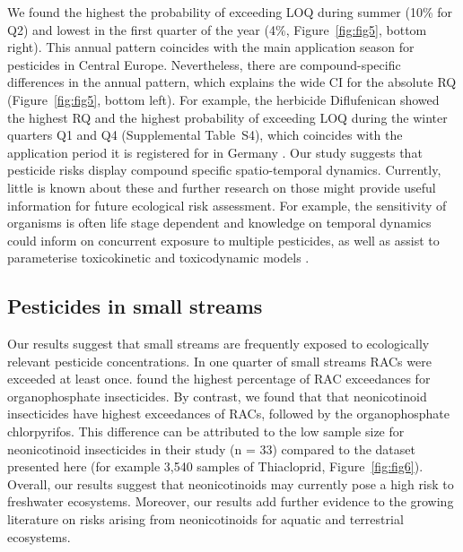 \documentclass[journal=esthag,manuscript=article]{achemso}
\begin{document}
We found the highest the probability of exceeding LOQ during summer (10\% for Q2) and lowest in the first quarter of the year (4\%, Figure~\ref{fig:fig5}, bottom right).
This annual pattern coincides with the main application season for pesticides in Central Europe.
Nevertheless, there are compound-specific differences in the annual pattern, which explains the wide CI for the absolute RQ (Figure~\ref{fig:fig5}, bottom left). 
For example, the herbicide Diflufenican showed the highest RQ and the highest probability of exceeding LOQ during the winter quarters Q1 and Q4 (Supplemental Table~S4), which coincides with the application period it is registered for in Germany \citep{bvl_online_2016}.
Our study suggests that pesticide risks display compound specific spatio-temporal dynamics.
Currently, little is known about these and further research on those might provide useful information for future ecological risk assessment. 
For example, the sensitivity of organisms is often life stage dependent \citep{hutchinson1998analysis} and knowledge on temporal dynamics could inform on concurrent exposure to multiple pesticides, as well as assist to parameterise toxicokinetic and toxicodynamic models \citep{ashauer2016modelling}. 


\subsection{Pesticides in small streams}
Our results suggest that small streams are frequently exposed to ecologically relevant pesticide concentrations.
In one quarter of small streams RACs were exceeded at least once.
\citet{stehle_pesticide_2015} found the highest percentage of RAC exceedances for organophosphate insecticides. 
By contrast, we found that that neonicotinoid insecticides have highest exceedances of RACs, followed by the organophosphate chlorpyrifos. 
This difference can be attributed to the low sample size for neonicotinoid insecticides in their study (n = 33) compared to the dataset presented here (for example 3,540 samples of Thiacloprid, Figure~\ref{fig:fig6}). 
Overall, our results suggest that neonicotinoids may currently pose a high risk to freshwater ecosystems. 
Moreover, our results add further evidence to the growing literature on risks arising from neonicotinoids for aquatic \citep{morrissey2015neonicotinoid} and terrestrial \citep{pisa2015effects} ecosystems. 
\end{document}
